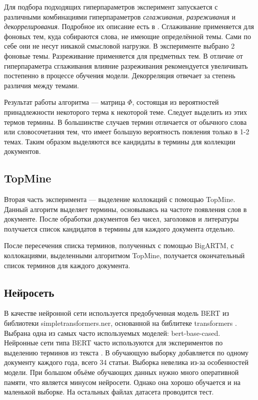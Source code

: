 \documentclass[a4paper, 12pt]{article}
\begin{document}
    Для подбора подходящих гиперпараметров эксперимент запускается с различными комбинациями гиперпараметров \textit{сглаживания}, \textit{разреживания} и \textit{декоррелирования}. Подробное их описание есть в \citep{Vorontsov2014}. Сглаживание применяется для фоновых тем, куда собираются слова, не имеющие определённой темы. Сами по себе они не несут никакой смысловой нагрузки. В эксперименте выбрано 2 фоновые темы. Разреживание применяется для предметных тем. В отличие от гиперпараметра сглаживания влияние разреживания рекомендуется увеличивать постепенно в процессе обучения модели. Декорреляция отвечает за степень различия между темами.

    Результат работы алгоритма --- матрица $\Phi$, состоящая из вероятностей принадлежности некоторого терма к некоторой теме. Следует выделить из этих термов термины. В большинстве случаев термин отличается от обычного слова или словосочетания тем, что имеет большую вероятность пояления только в 1-2 темах. Таким образом выделяются все кандидаты в термины для коллекции документов.

\subsection{TopMine}
    Вторая часть эксперимента --- выделение коллокаций с помощью TopMine. Данный алгоритм выделяет термины, основываясь на частоте появления слов в документе. После обработки документов без чисел, заголовков и литературы получается список кандидатов в термины для каждого документа отдельно.

    После пересечения списка терминов, полученных с помощью BigARTM, с коллокациями, выделенными алгоритмом TopMine, получается окончательный список терминов для каждого документа.

\subsection{Нейросеть}

    В качестве нейронной сети используется предобученная модель BERT из библиотеки simpletransformers.ner, основанной на библитеке transformers \citep{wolf-etal-2020-transformers}. Выбрана одна из самых часто используемых моделей: bert-base-cased. Нейронные сети типа BERT часто используются для экспериментов по выделению терминов из текста \citep{ElKishky2014}. В обучающую выборку добавляется по одному документу каждого года, всего 34 статьи. Выборка невелика из-за особенностей модели. При большом объёме обучающих данных нужно много оперативной памяти, что является минусом нейросети. Однако она хорошо обучается и на маленькой выборке. На остальных файлах датасета проводится тест.
\end{document}
